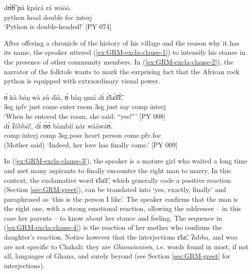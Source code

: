 \ex\label{ex:GRM-excla-clause-2}
\gll dʊ̃́ʊ̃́ ɲú kpárá rá wōōō.\\
python head double {\sc foc} {\sc interj}\\
\glt `Python is double-headed!'  [PY 074]

\z
\z


After offering a chronicle of the history of his village and the reason why it has its name, the 
speaker 
uttered (\ref{ex:GRM-excla-clause-1}) to intensify his stance in the presence of other community 
members. In  (\ref{ex:GRM-excla-clause-2}), the narrator of the folktale wants to mark the 
surprising fact that the African rock python is equipped with extraordinary visual power.



\ea\label{ex:GRM-excla-clause-3-4}
\ea\label{ex:GRM-excla-clause-3}
\gll  ʊ̀ kà báŋ wà zú dìà, ʊ̀ bàŋ ŋmá dɪ́  ɛ̃̀hɛ̃́ɛ̃̄ɛ̃̀.\\
{\sc 3sg} {\sc ipfv} just come enter room  {\sc 3sg} just say {\sc comp}  {\sc interj}  \\
\glt `When he entered  the room,  she said: ``yes!''' [PY 008]\\

\ex\label{ex:GRM-excla-clause-4}
\gll dɪ́ ʔábbā!, dɪ́  ʊ̀ʊ̀ bàmbíí nár wááwáʊ́.\\
{\sc comp}  {\sc interj} {\sc comp}  {\sc 3sg.poss} heart person come.{\sc pfv.foc}\\
\glt (Mother said) `Indeed,   her love has finally come.'  [PY 009]\\

\z
\z

In  (\ref{ex:GRM-excla-clause-3}), the  speaker is a mature girl who waited a long time and met 
many aspirants to finally encounter the right man to marry. In this context, the exclamative word  
{\sls ɛ̃hɛ̃ɛ̃}, which generally code a positive reaction (Section \ref{sec:GRM-greet}),  can be 
translated into `yes, exactly, finally' and paraphrased as  `this is the person I like'.   The 
speaker confirms that the man is the right one, with a strong emotional reaction,  allowing the 
addressee -- in this case her parents -- to know about her stance and feeling. The sequence in  
(\ref{ex:GRM-excla-clause-4})  is the reaction of her mother who confirms the daughter's reaction. 
Notice however  that the interjections {\sls ɛ̃hɛ̃}, {\sls ʔabba}, and {\sls woo} are not specific 
to Chakali: they are {\it Ghanaianism}, i.e. words found in most, if not all, languages of Ghana, and surely beyond (see  Section \ref{sec:GRM-greet} for interjections).



